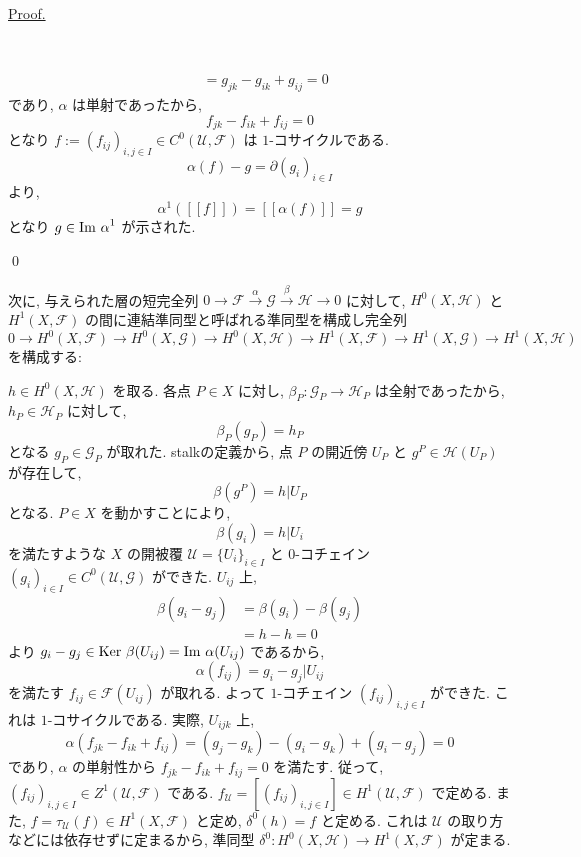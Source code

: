\documentclass[a4paper,10pt,dvipdfmx]{jsreport}
\renewenvironment{proof}{\begin{flushleft} \underline{Proof.} \end{flushleft}\vspace{-1zh}\ }{\qed\\}
\renewcommand{\Im}[1]{{{\rm Im\ }{#1}}}
\renewcommand{\ker}{\textrm{Ker }}
\theoremstyle{definition}
\begin{document}
\begin{proof}
\begin{itemize}
\begin{align*}
                &= g_{jk} - g_{ik} +g_{ij} = 0
            \end{align*}
            であり, \(\alpha\) は単射であったから,
            \[
                f_{jk} -f_{ik} + f_{ij} = 0
            \]
            となり \(f := (f_{ij})_{i,j\in I}\in C^0(\mathcal{U},\mathscr{F})\) は \(1\)-コサイクルである.
            \[
                \alpha(f) - g = \partial(g_i)_{i\in I}
            \]
            より,
            \[
                \alpha^1 ([[f]]) = [[\alpha(f)]] = g
            \]
            となり \(g\in \Im \alpha^1\) が示された.
    \end{itemize}    
\end{proof}

次に, 与えられた層の短完全列 \(0 \to \mathscr{F} \xrightarrow{\alpha} \mathscr{G} \xrightarrow{\beta} \mathscr{H}\to 0\) に対して, \(H^0(X,\mathscr{H})\) と \(H^1(X,\mathscr{F})\) の間に連結準同型と呼ばれる準同型を構成し完全列 \(0 \to H^0(X,\mathscr{F}) \to H^0(X,\mathscr{G}) \to H^0(X,\mathscr{H}) \to H^1(X,\mathscr{F}) \to H^1(X,\mathscr{G}) \to H^1(X,\mathscr{H})\) を構成する:

\(h\in H^0(X,\mathscr{H})\) を取る. 各点 \(P\in X\) に対し, \(\beta_P \colon \mathscr{G}_P \to \mathscr{H}_P\) は全射であったから, \(h_P \in \mathscr{H}_P\) に対して,
\[
    \beta_P(g_P) = h_P
\]
となる \(g_P \in \mathscr{G}_P\) が取れた. stalkの定義から, 点 \(P\) の開近傍 \(U_P\) と \(g^P \in \mathscr{H}(U_P)\) が存在して,
\[
    \beta(g^P) = h|U_P
\]
となる. \(P \in X\) を動かすことにより,
\begin{equation}
    \beta(g_i) = h|U_i \label{eq:construction of connecting homomorphism 1}
\end{equation}
を満たすような \(X\) の開被覆 \(\mathcal{U} = \{U_i\}_{i\in I}\) と \(0\)-コチェイン \((g_i)_{i \in I} \in C^0 (\mathcal{U},\mathscr{G})\) ができた. \(U_{ij}\) 上,
\begin{align*}
    \beta(g_i - g_j) 
    &= \beta(g_i) - \beta(g_j)\\
    &= h - h = 0
\end{align*}
より \(g_i - g_j \in \ker \beta(U_{ij}) = \Im \alpha(U_{ij})\) であるから,
\begin{equation}
    \alpha(f_{ij}) = g_i - g_j |U_{ij} \label{eq:construction of connecting homomorphism 2}
\end{equation}
を満たす \(f_{ij} \in \mathscr{F}(U_{ij})\) が取れる. よって \(1\)-コチェイン \((f_{ij})_{i,j \in I}\) ができた. これは \(1\)-コサイクルである. 実際, \(U_{ijk}\) 上,
\[
    \alpha(f_{jk} - f_{ik} + f_{ij}) = (g_j -g_k) - (g_i -g_k) + (g_i -g_j) = 0
\]
であり, \(\alpha\) の単射性から \(f_{jk} - f_{ik} + f_{ij} = 0\) を満たす. 従って, \((f_{ij})_{i,j \in I} \in Z^1(\mathcal{U},\mathscr{F})\) である. \(f_\mathcal{U} = [(f_{ij})_{i,j \in I}] \in H^1(\mathcal{U}, \mathscr{F})\) で定める. また, \(f = \tau_\mathcal{U}(f)\in H^1(X, \mathscr{F})\) と定め, \(\delta^0(h) = f\) と定める. これは \(\mathcal{U}\) の取り方などには依存せずに定まるから, 準同型 \(\delta^0 \colon H^0(X,\mathscr{H}) \to H^1(X,\mathscr{F})\) が定まる.
\end{document}
